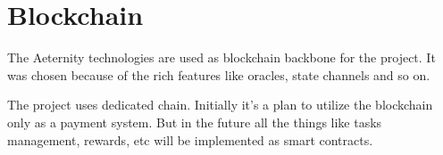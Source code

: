 \section{Blockchain}

The Aeternity technologies are used as blockchain backbone for the project.
It was chosen because of the rich features like oracles, state channels and so on.

The project uses dedicated chain.
Initially it's a plan to utilize the blockchain only as a payment system.
But in the future all the things like tasks management, rewards, etc will be implemented as smart contracts.
